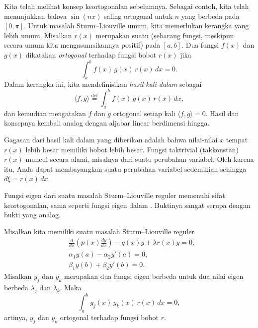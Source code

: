 Kita telah melihat konsep keortogonalan sebelumnya.  Sebagai contoh,
kita telah menunjukkan bahwa $\sin (nx)$ saling ortogonal untuk $n$ yang berbeda pada $[0,\pi]$.
Untuk masalah Sturm--Liouville umum, kita memerlukan kerangka yang lebih umum.
Misalkan $r(x)$
merupakan suatu \emph{} (sebarang fungsi, meskipun secara umum kita
mengasumsikannya positif) pada $[a,b]$.  Dua fungsi $f(x)$ dan $g(x)$
dikatakan
\emph{ortogonal} 
terhadap fungsi bobot
$r(x)$ jika
\begin{equation*}
\int_a^b f(x) \, g(x) \, r(x) \,dx = 0 .
\end{equation*}
Dalam kerangka ini,
kita mendefinisikan \emph{hasil kali dalam} sebagai
\begin{equation*}
\langle f , g \rangle \overset{\text{def}}{=} \int_a^b f(x) \, g(x) \, r(x)
\,dx ,
\end{equation*}
dan kemudian mengatakan $f$ dan $g$ ortogonal setiap kali $\langle f , g \rangle = 0$.
Hasil dan konsepnya kembali analog dengan 
aljabar linear berdimensi hingga.

Gagasan dari hasil kali dalam yang diberikan adalah bahwa nilai-nilai $x$ tempat $r(x)$
lebih besar memiliki bobot lebih besar.
Fungsi taktrivial (takkonstan)
$r(x)$ muncul secara alami, misalnya dari suatu perubahan variabel.
Oleh karena itu, Anda dapat
membayangkan suatu perubahan variabel sedemikian sehingga $d\xi = r(x)\, dx$.

Fungsi eigen dari suatu
masalah Sturm--Liouville reguler memenuhi sifat keortogonalan, sama seperti
fungsi eigen dalam .
Buktinya sangat serupa dengan bukti 
 yang analog.

\begin{theorem}
Misalkan kita memiliki suatu masalah Sturm--Liouville reguler
\begin{align*}
&\frac{d}{dx} \left( p(x) \frac{dy}{dx} \right)
- q(x) y + \lambda r(x) y = 0 , \\
&\alpha_1 y(a) - \alpha_2 y'(a) = 0 , \\
&\beta_1 y(b) + \beta_2 y'(b) = 0 .
\end{align*}
Misalkan $y_j$ dan $y_k$ merupakan dua fungsi eigen berbeda untuk dua
nilai eigen berbeda $\lambda_j$ dan $\lambda_k$.  Maka
\begin{equation*}
\int_a^b y_j(x) \, y_k(x) \, r(x) \,dx = 0,
\end{equation*}
artinya, $y_j$ dan $y_k$ ortogonal terhadap fungsi bobot
$r$.
\end{theorem}


